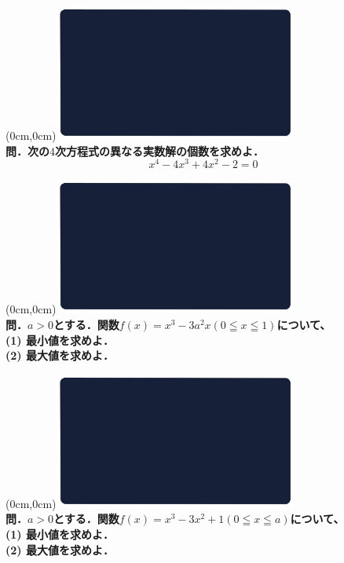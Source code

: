 \documentclass[10pt,
fleqn,
dvipdfmx,
uplatex
]{jsarticle}
\begin{document}
\newpage



\at(0cm,0cm){\includegraphics[width=8cm,bb=0 0 1920 1080]{./media_local/smart_background/数II微積.jpeg}}
\vspace{0.3zw}\\
\noindent\Large 
\bf\boldmath 問．次の$4$次方程式の異なる実数解の個数を求めよ．
\[x^4-4x^3+4x^2-2=0\]


\newpage



\at(0cm,0cm){\includegraphics[width=8cm,bb=0 0 1920 1080]{./media_local/smart_background/数II微積.jpeg}}
\vspace{0.3zw}\\
\noindent\large 
\bf\boldmath 問．$a>0$とする．関数$f\left(x\right)=x^3-3a^2x\left(0\leqq x\leqq 1\right)$について、\\
(1)  最小値を求めよ．\\
(2)  最大値を求めよ．\\



\newpage



\at(0cm,0cm){\includegraphics[width=8cm,bb=0 0 1920 1080]{./media_local/smart_background/数II微積.jpeg}}
\vspace{0.3zw}\\
\noindent\large 
\bf\boldmath 問．$a>0$とする．関数$f\left(x\right)=x^3-3x^2+1\left(0\leqq x\leqq a\right)$について、\\
(1)  最小値を求めよ．\\
(2)  最大値を求めよ．\\
\end{document}
